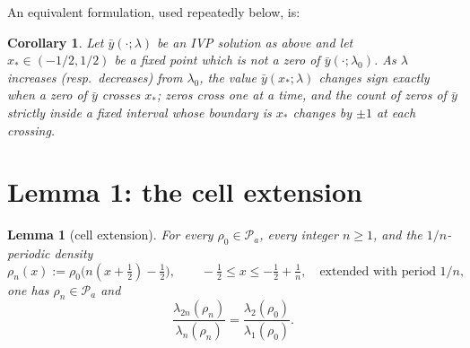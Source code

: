 ﻿\documentclass[11pt]{article}
\newtheorem{lemma}[theorem]{Lemma}
\newtheorem{corollary}[theorem]{Corollary}
\begin{document}
\noindent An equivalent formulation, used repeatedly below, is:

\begin{corollary}\label{cor:crossing}
	Let $\bar y(\cdot;\lambda)$ be an IVP solution as above and let
	$x_*\in(-1/2,1/2)$ be a fixed point which is not a zero of
	$\bar y(\cdot;\lambda_0)$.  As $\lambda$ increases (resp.\ decreases)
	from $\lambda_0$, the value $\bar y(x_*;\lambda)$ changes sign exactly
	when a zero of $\bar y$ crosses $x_*$; zeros cross one at a time, and
	the count of zeros of $\bar y$ strictly inside a fixed interval whose
	boundary is $x_*$ changes by $\pm 1$ at each crossing.
\end{corollary}

\section{Lemma 1: the cell extension}\label{sec:lemma1}

\begin{lemma}[cell extension]\label{lem:cell}
	For every $\rho_0\in\mathcal P_a$, every integer $n\ge 1$, and the
	$1/n$-periodic density
	\begin{equation*}
		\rho_n(x):=\rho_0\bigl(n(x+\tfrac12)-\tfrac12\bigr),
		\qquad -\tfrac12\le x\le -\tfrac12+\tfrac1n,
		\quad\text{extended with period }1/n,
	\end{equation*}
	one has $\rho_n\in\mathcal P_a$ and
	\begin{equation}
		\frac{\lambda_{2n}(\rho_n)}{\lambda_n(\rho_n)}
		=\frac{\lambda_2(\rho_0)}{\lambda_1(\rho_0)}.
		\label{eq:cellidentity}
	\end{equation}
\end{lemma}
\end{document}
